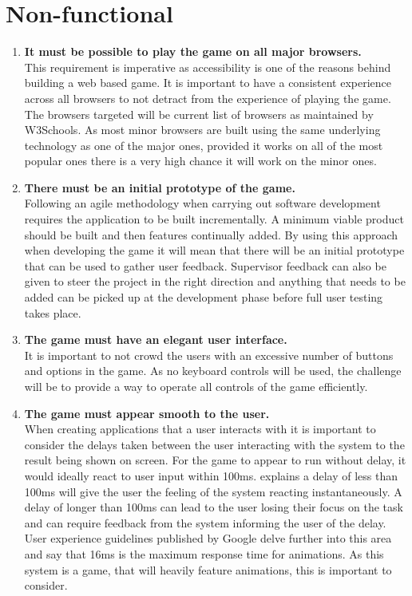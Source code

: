 \documentclass[12pt,a4paper]{report}
\begin{document}
         \section{Non-functional}
   \begin{enumerate}[label*=\arabic*]
            \item \textbf{It must be possible to play the game on all major browsers.}\\
            This requirement is imperative as accessibility is one of the reasons behind building a web based game. It is important to have a consistent experience across all browsers to not detract from the experience of playing the game. The browsers targeted will be current list of browsers as maintained by W3Schools. As most minor browsers are built using the same underlying technology as one of the major ones, provided it works on all of the most popular ones there is a very high chance it will work on the minor ones.    
            
            
             \item \textbf{There must be an initial prototype of the game.
}\\
            Following an agile methodology when carrying out software development requires the application to be built incrementally. A minimum viable product should be built and then features continually added. By using this approach when developing the game it will mean that there will be an initial prototype that can be used to gather user feedback. Supervisor feedback can also be given to steer the project in the right direction and anything that needs to be added can be picked up at the development phase before full user testing takes place.
            
            
                         \item \textbf{The game must have an elegant user interface.}\\
It is important to not crowd the users with an excessive number of buttons and options in the game. As no keyboard controls will be used, the challenge will be to provide a way to operate all controls of the game efficiently.
            
                        
                         \item \textbf{The game must appear smooth to the user.}\\
When creating applications that a user interacts with it is important to consider the delays taken between the user interacting with the system to the result being shown on screen. For the game to appear to run without delay, it would ideally react to user input within 100ms. \citep{nielsen1994usability} explains a delay of less than 100ms will give the user the feeling of the system reacting instantaneously. A delay of longer than 100ms can lead to the user losing their focus on the task and can require feedback from the system informing the user of the delay. User experience guidelines published by Google delve further into this area and say that 16ms is the maximum response time for animations. As this system is a game, that will heavily feature animations, this is important to consider.
             

\end{enumerate}
\end{document}
